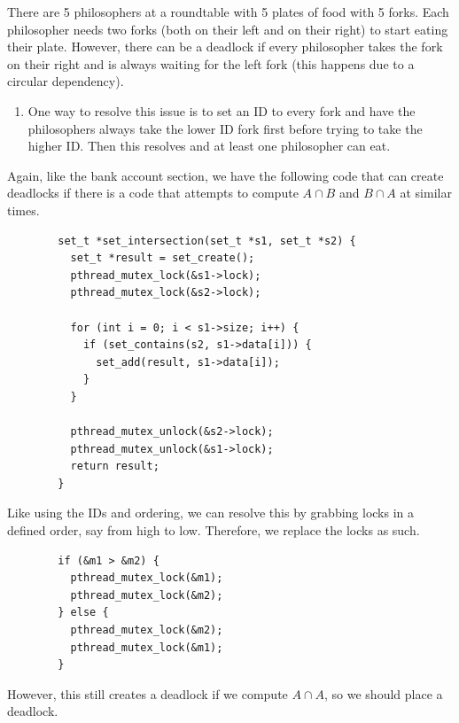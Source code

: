\documentclass{article}
\begin{document}
    \begin{example}
      There are 5 philosophers at a roundtable with 5 plates of food with 5 forks. Each philosopher needs two forks (both on their left and on their right) to start eating their plate. However, there can be a deadlock if every philosopher takes the fork on their right and is always waiting for the left fork (this happens due to a circular dependency). 
      \begin{enumerate}
        \item One way to resolve this issue is to set an ID to every fork and have the philosophers always take the lower ID fork first before trying to take the higher ID. Then this resolves and at least one philosopher can eat. 
      \end{enumerate}
    \end{example}

    \begin{example}
      Again, like the bank account section, we have the following code that can create deadlocks if there is a code that attempts to compute $A \cap B$ and $B \cap A$ at similar times. 
      \begin{lstlisting}
        set_t *set_intersection(set_t *s1, set_t *s2) {
          set_t *result = set_create(); 
          pthread_mutex_lock(&s1->lock); 
          pthread_mutex_lock(&s2->lock); 

          for (int i = 0; i < s1->size; i++) {
            if (set_contains(s2, s1->data[i])) {
              set_add(result, s1->data[i]); 
            }
          }

          pthread_mutex_unlock(&s2->lock); 
          pthread_mutex_unlock(&s1->lock); 
          return result; 
        }
      \end{lstlisting}
      Like using the IDs and ordering, we can resolve this by grabbing locks in a defined order, say from high to low. Therefore, we replace the locks as such.
      \begin{lstlisting}
        if (&m1 > &m2) {
          pthread_mutex_lock(&m1); 
          pthread_mutex_lock(&m2); 
        } else {
          pthread_mutex_lock(&m2); 
          pthread_mutex_lock(&m1); 
        }
      \end{lstlisting}
      However, this still creates a deadlock if we compute $A \cap A$, so we should place a deadlock. 
    \end{example}
\end{document}
